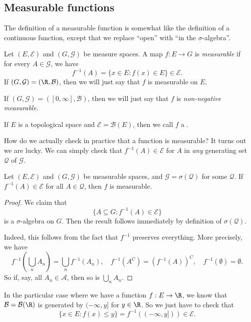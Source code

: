 \documentclass[a4paper]{article}
\begin{document}
\subsection{Measurable functions}
The definition of a measurable function is somewhat like the definition of a continuous function, except that we replace ``open'' with ``in the $\sigma$-algebra''.

\begin{defi}
  Let $(E, \mathcal{E})$ and $(G, \mathcal{G})$ be measure spaces. A map $f: E \to G$ is \emph{measurable} if for every $A \in \mathcal{G}$, we have
  \[
    f^{-1}(A) = \{x \in E: f(x) \in E\} \in \mathcal{E}.
  \]
  If $(G, \mathcal{G}) = (\R, \mathcal{B})$, then we will just say that $f$ is measurable on $E$.

  If $(G, \mathcal{G}) = ([0, \infty], \mathcal{B})$, then we will just say that $f$ is \emph{non-negative measurable}.

  If $E$ is a topological space and $\mathcal{E} = \mathcal{B}(E)$, then we call $f$ a .
\end{defi}

How do we actually check in practice that a function is measurable? It turns out we are lucky. We can simply check that $f^{-1}(A) \in \mathcal{E}$ for $A$ in \emph{any} generating set $\mathcal{Q}$ of $\mathcal{G}$.
\begin{lemma}
  Let $(E, \mathcal{E})$ and $(G, \mathcal{G})$ be measurable spaces, and $\mathcal{G} = \sigma(\mathcal{Q})$ for some $\mathcal{Q}$. If $f^{-1}(A) \in \mathcal{E}$ for all $A \in \mathcal{Q}$, then $f$ is measurable.
\end{lemma}

\begin{proof}
  We claim that
  \[
    \{A \subseteq G: f^{-1}(A) \in \mathcal{E}\}
  \]
  is a $\sigma$-algebra on $G$. Then the result follows immediately by definition of $\sigma(\mathcal{Q})$.

  Indeed, this follows from the fact that $f^{-1}$ preserves everything. More precisely, we have
  \[
    f^{-1}\left(\bigcup_n A_n\right) = \bigcup_n f^{-1}(A_n),\quad f^{-1}(A^C) = (f^{-1}(A))^C,\quad f^{-1}(\emptyset) = \emptyset.
  \]
  So if, say, all $A_n \in \mathcal{A}$, then so is $\bigcup_n A_n$.
\end{proof}

\begin{eg}
  In the particular case where we have a function $f: E \to \R$, we know that $\mathcal{B} = \mathcal{B}(\R)$ is generated by $(-\infty, y]$ for $y \in \R$. So we just have to check that
  \[
    \{x \in E: f(x) \leq y\} = f^{-1}((-\infty, y])) \in \mathcal{E}.
  \]
\end{eg}
\end{document}
